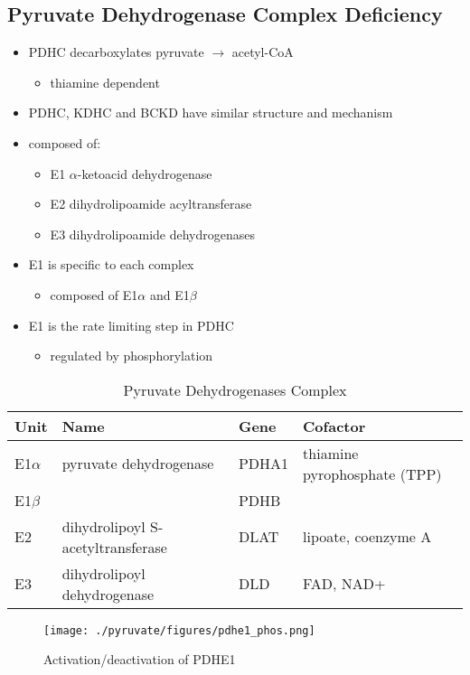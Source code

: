 \documentclass{scrartcl}
\begin{document}
\subsection{Pyruvate Dehydrogenase Complex Deficiency}
\label{sec:org52e2b82}
\begin{itemize}
\item PDHC decarboxylates pyruvate \(\to\) acetyl-CoA
\begin{itemize}
\item thiamine dependent
\end{itemize}
\item PDHC, KDHC and BCKD have similar structure and mechanism
\item composed of:
\begin{itemize}
\item E1 \(\alpha\)-ketoacid dehydrogenase
\item E2 dihydrolipoamide acyltransferase
\item E3 dihydrolipoamide dehydrogenases
\end{itemize}
\item E1 is specific to each complex
\begin{itemize}
\item composed of E1\(\alpha\) and E1\(\beta\)
\end{itemize}
\item E1 is the rate limiting step in PDHC
\begin{itemize}
\item regulated by phosphorylation
\end{itemize}
\end{itemize}

\begin{table}[htbp]
\caption{\label{tab:org2696ec2}
Pyruvate Dehydrogenases Complex}
\centering
\begin{tabular}{llll}
Unit & Name & Gene & Cofactor\\
\hline
E1\(\alpha\) & pyruvate dehydrogenase & PDHA1 & thiamine pyrophosphate (TPP)\\
E1\(\beta\) &  & PDHB & \\
E2 & dihydrolipoyl  S-acetyltransferase & DLAT & lipoate, coenzyme A\\
E3 & dihydrolipoyl dehydrogenase & DLD & FAD, NAD+\\
\end{tabular}
\end{table}



\begin{figure}[htbp]
\centering
\texttt{[image: ./pyruvate/figures/pdhe1\_phos.png]}
\caption[pdhe1]{\label{fig:org2407da8}
Activation/deactivation of PDHE1}
\end{figure}
\end{document}
